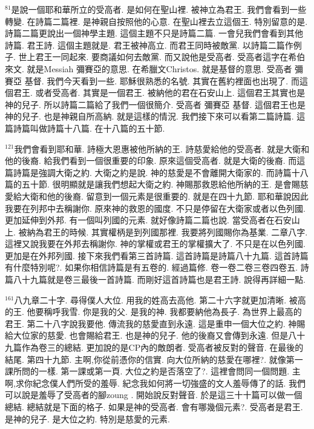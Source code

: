 \documentclass{book}
\begin{document}
$^{81}$是說一個耶和華所立的受高者.
是如何在聖山裡.
被神立為君王.
我們會看到一些轉變.
在詩篇二篇裡.
是神親自按照他的心意.
在聖山裡去立這個王.
特別留意的是.
詩篇二篇更說出一個神學主題.
這個主題不只是詩篇二篇.
一會兒我們會看到其他詩篇.
君王詩.
這個主題就是.
君王被神高立.
而君王同時被敵黨.
以詩篇二篇作例子.
世上君王一同起來.
要商議如何去敵黨.
而又說他是受高者.
受高者這字在希伯來文.
就是Messiah 彌賽亞的意思.
在希臘文Christos.
就是基督的意思.
受高者 彌賽亞 基督.
我們今天看到一些.
耶穌很熟悉的名號.
其實在舊約裡面也出現了.
而這個君王.
或者受高者.
其實是一個君王.
被納他的君在石安山上.
這個君王其實也是神的兒子.
所以詩篇二篇給了我們一個很簡介.
受高者 彌賽亞 基督.
這個君王也是神的兒子.
也是神親自所高納.
就是這樣的情況.
我們接下來可以看第二篇詩篇.
這篇詩篇叫做詩篇十八篇.
在十八篇的五十節.

$^{121}$我們會看到耶和華.
詩極大恩惠被他所納的王.
詩慈愛給他的受高者.
就是大衛和他的後裔.
給我們看到一個很重要的印象.
原來這個受高者.
就是大衛的後裔.
而這篇詩篇是強調大衛之約.
大衛之約是說.
神的慈愛是不會離開大衛家的.
而詩篇十八篇的五十節.
很明顯就是讓我們想起大衛之約.
神賜那救恩給他所納的王.
是會賜慈愛給大衛和他的後裔.
留意到一個元素是很重要的.
就是在四十九節.
耶和華說因此我要在列邦中去稱謝你.
原來神的救恩的國度.
不只是停留在大衛家或者以色列國.
更加延伸到外邦.
有一個叫列國的元素.
就好像詩篇二篇也說.
當受高者在石安山上.
被納為君王的時候.
其實權柄是到列國那裡.
我要將列國賜你為基業.
二章八字.
這裡又說我要在外邦去稱謝你.
神的掌權或君王的掌權擴大了.
不只是在以色列國.
更加是在外邦列國.
接下來我們看第三首詩篇.
這首詩篇是詩篇八十九篇.
這首詩篇有什麼特別呢?.
如果你相信詩篇是有五卷的.
經過篇修.
卷一卷二卷三卷四卷五.
詩篇八十九篇就是卷三最後一首詩篇.
而剛好這首詩篇也是君王詩.
說得再詳細一點.

$^{161}$八九章二十字.
尋得僕人大位.
用我的姓高去高他.
第二十六字就更加清晰.
被高的王.
他要稱呼我雪.
你是我的父.
是我的神.
我都要納他為長子.
為世界上最高的君王.
第二十八字說我要他.
傳流我的慈愛直到永遠.
這是重申一個大位之約.
神賜給大位家的慈愛.
也會賜給君王.
也是神的兒子.
他的後裔又會傳到永遠.
但是八十九篇作為卷三的總結.
更加說的是CP內的敵朗者.
受高者被反對的聲音.
在最後的結尾.
第四十九節.
主啊,你從前憑你的信實.
向大位所納的慈愛在哪裡?.
就像第一課所問的一樣.
第一課或第一頁.
大位之約是否落空了?.
這裡會問同一個問題.
主啊,求你紀念僕人們所受的羞辱.
紀念我如何將一切強盛的文人羞辱傳了的話.
我們可以說是羞辱了受高者的腳zoung .
開始說反對聲音.
於是這三十十篇可以做一個總結.
總結就是下面的格子.
如果是神的受高者.
會有哪幾個元素?.
受高者是君王.
是神的兒子.
是大位之約.
特別是慈愛的元素.
\end{document}
